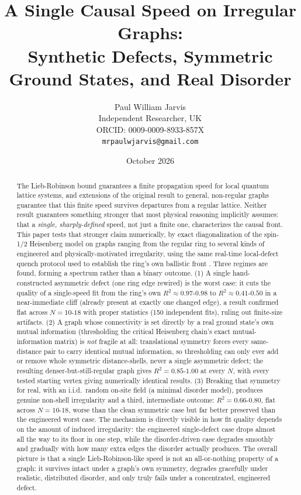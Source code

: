 \documentclass[11pt]{article}
\title{A Single Causal Speed on Irregular Graphs:\\
Synthetic Defects, Symmetric Ground States, and Real Disorder}
\author{Paul William Jarvis \\
Independent Researcher, UK \\
ORCID: 0009-0009-8933-857X \\
\texttt{mrpaulwjarvis@gmail.com}}
\date{October 2026}
\begin{document}
\maketitle

\begin{abstract}
The Lieb-Robinson bound guarantees a finite propagation speed for local quantum lattice systems, and extensions of the original result to general, non-regular graphs \cite{NachtergaeleSims2006,NachtergaeleSims2007,NOS2006} guarantee that this finite speed survives departures from a regular lattice. Neither result guarantees something stronger that most physical reasoning implicitly assumes: that a \emph{single, sharply-defined} speed, not just a finite one, characterizes the causal front. This paper tests that stronger claim numerically, by exact diagonalization of the spin-1/2 Heisenberg model on graphs ranging from the regular ring to several kinds of engineered and physically-motivated irregularity, using the same real-time local-defect quench protocol used to establish the ring's own ballistic front \cite{Cheneau2012}. Three regimes are found, forming a spectrum rather than a binary outcome. (1) A single hand-constructed asymmetric defect (one ring edge rewired) is the worst case: it cuts the quality of a single-speed fit from the ring's own $R^2\approx0.97$-$0.98$ to $R^2\approx0.41$-$0.50$ in a near-immediate cliff (already present at exactly one changed edge), a result confirmed flat across $N=10$-$18$ with proper statistics (150 independent fits), ruling out finite-size artifacts. (2) A graph whose connectivity is set directly by a real ground state's own mutual information (thresholding the critical Heisenberg chain's exact mutual-information matrix) is \emph{not} fragile at all: translational symmetry forces every same-distance pair to carry identical mutual information, so thresholding can only ever add or remove whole symmetric distance-shells, never a single asymmetric defect; the resulting denser-but-still-regular graph gives $R^2=0.85$-$1.00$ at every $N$, with every tested starting vertex giving numerically identical results. (3) Breaking that symmetry for real, with an i.i.d.\ random on-site field (a minimal disorder model), produces genuine non-shell irregularity and a third, intermediate outcome: $R^2=0.66$-$0.80$, flat across $N=10$-$18$, worse than the clean symmetric case but far better preserved than the engineered worst case. The mechanism is directly visible in how fit quality depends on the amount of induced irregularity: the engineered single-defect case drops almost all the way to its floor in one step, while the disorder-driven case degrades smoothly and gradually with how many extra edges the disorder actually produces. The overall picture is that a single Lieb-Robinson-like speed is not an all-or-nothing property of a graph: it survives intact under a graph's own symmetry, degrades gracefully under realistic, distributed disorder, and only truly fails under a concentrated, engineered defect.
\end{abstract}
\end{document}
